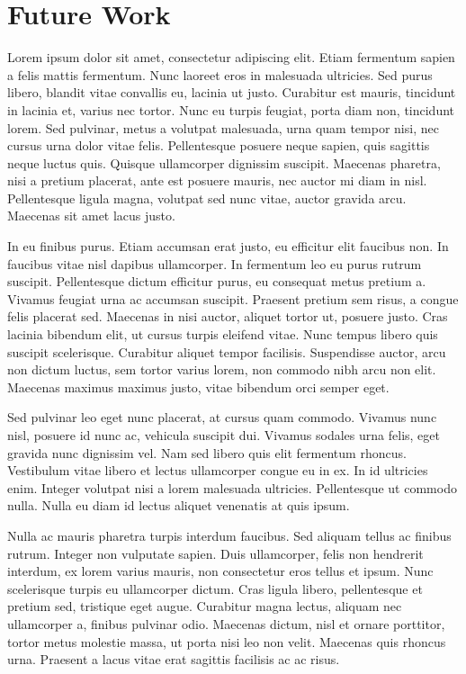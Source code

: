 \section{Future Work}
\label{sec:futurework}

Lorem ipsum dolor sit amet, consectetur adipiscing elit. Etiam fermentum sapien a felis mattis fermentum. Nunc laoreet eros in malesuada ultricies. Sed purus libero, blandit vitae convallis eu, lacinia ut justo. Curabitur est mauris, tincidunt in lacinia et, varius nec tortor. Nunc eu turpis feugiat, porta diam non, tincidunt lorem. Sed pulvinar, metus a volutpat malesuada, urna quam tempor nisi, nec cursus urna dolor vitae felis. Pellentesque posuere neque sapien, quis sagittis neque luctus quis. Quisque ullamcorper dignissim suscipit. Maecenas pharetra, nisi a pretium placerat, ante est posuere mauris, nec auctor mi diam in nisl. Pellentesque ligula magna, volutpat sed nunc vitae, auctor gravida arcu. Maecenas sit amet lacus justo.

\vspace{2mm}

In eu finibus purus. Etiam accumsan erat justo, eu efficitur elit faucibus non. In faucibus vitae nisl dapibus ullamcorper. In fermentum leo eu purus rutrum suscipit. Pellentesque dictum efficitur purus, eu consequat metus pretium a. Vivamus feugiat urna ac accumsan suscipit. Praesent pretium sem risus, a congue felis placerat sed. Maecenas in nisi auctor, aliquet tortor ut, posuere justo. Cras lacinia bibendum elit, ut cursus turpis eleifend vitae. Nunc tempus libero quis suscipit scelerisque. Curabitur aliquet tempor facilisis. Suspendisse auctor, arcu non dictum luctus, sem tortor varius lorem, non commodo nibh arcu non elit. Maecenas maximus maximus justo, vitae bibendum orci semper eget.

\vspace{2mm}

Sed pulvinar leo eget nunc placerat, at cursus quam commodo. Vivamus nunc nisl, posuere id nunc ac, vehicula suscipit dui. Vivamus sodales urna felis, eget gravida nunc dignissim vel. Nam sed libero quis elit fermentum rhoncus. Vestibulum vitae libero et lectus ullamcorper congue eu in ex. In id ultricies enim. Integer volutpat nisi a lorem malesuada ultricies. Pellentesque ut commodo nulla. Nulla eu diam id lectus aliquet venenatis at quis ipsum.

\vspace{2mm}

Nulla ac mauris pharetra turpis interdum faucibus. Sed aliquam tellus ac finibus rutrum. Integer non vulputate sapien. Duis ullamcorper, felis non hendrerit interdum, ex lorem varius mauris, non consectetur eros tellus et ipsum. Nunc scelerisque turpis eu ullamcorper dictum. Cras ligula libero, pellentesque et pretium sed, tristique eget augue. Curabitur magna lectus, aliquam nec ullamcorper a, finibus pulvinar odio. Maecenas dictum, nisl et ornare porttitor, tortor metus molestie massa, ut porta nisi leo non velit. Maecenas quis rhoncus urna. Praesent a lacus vitae erat sagittis facilisis ac ac risus.

